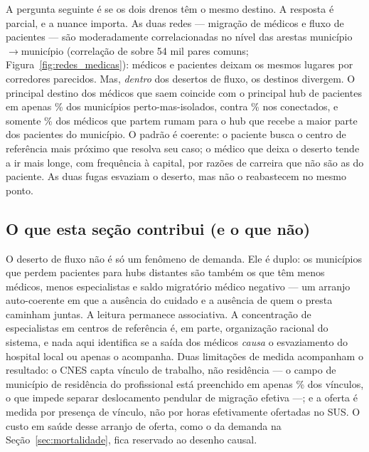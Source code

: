 A pergunta seguinte é se os dois drenos têm o mesmo destino. A resposta é
parcial, e a nuance importa. As duas redes --- migração de médicos e fluxo de
pacientes --- são moderadamente correlacionadas no nível das arestas
município$\rightarrow$município (correlação de \valNetCorr{} sobre 54 mil pares
comuns; Figura~\ref{fig:redes_medicas}): médicos e pacientes deixam os mesmos
lugares por corredores parecidos.%
Mas, \emph{dentro} dos desertos de fluxo, os destinos divergem. O principal
destino dos médicos que saem coincide com o principal hub de pacientes em apenas
\valTophubFO\% dos municípios perto-mas-isolados, contra \valTophubNE\% nos
conectados, e somente \valFracToHub\% dos médicos que partem rumam para o hub que
recebe a maior parte dos pacientes do município.%
O padrão é coerente: o paciente busca o centro de referência mais próximo que
resolva seu caso; o médico que deixa o deserto tende a ir mais longe, com
frequência à capital, por razões de carreira que não são as do paciente. As duas
fugas esvaziam o deserto, mas não o reabastecem no mesmo ponto.

\subsection{O que esta seção contribui (e o que não)}

O deserto de fluxo não é só um fenômeno de demanda. Ele é duplo: os municípios
que perdem pacientes para hubs distantes são também os que têm menos médicos,
menos especialistas e saldo migratório médico negativo --- um arranjo
auto-coerente em que a ausência do cuidado e a ausência de quem o presta
caminham juntas. A leitura permanece associativa. A concentração de especialistas
em centros de referência é, em parte, organização racional do sistema, e nada
aqui identifica se a saída dos médicos \emph{causa} o esvaziamento do hospital
local ou apenas o acompanha. Duas limitações de medida acompanham o resultado: o
CNES capta vínculo de trabalho, não residência --- o campo de município de
residência do profissional está preenchido em apenas \valUFMUNRESfill\% dos
vínculos, o que impede separar deslocamento pendular de migração efetiva ---;%
e a oferta é medida por presença de vínculo, não por horas efetivamente
ofertadas no SUS. O custo em saúde desse arranjo de oferta, como o da demanda na
Seção~\ref{sec:mortalidade}, fica reservado ao desenho causal.
